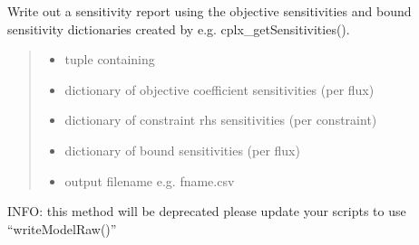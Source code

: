 \documentclass[letterpaper,12pt,english]{sphinxmanual}
\begin{document}
\begin{fulllineitems}

\pysigstartsignatures
\pysiglinewithargsret
{}
{\sphinxparamcomma {}}
{}
\pysigstopsignatures
\sphinxAtStartPar
Write out a sensitivity report using the objective sensitivities and bound sensitivity dictionaries created by e.g. cplx\_getSensitivities().
\begin{quote}\begin{description}
\begin{itemize}
\item {} 
\sphinxAtStartPar
{} \textendash{} tuple containing

\item {} 
\sphinxAtStartPar
{} \textendash{} dictionary of objective coefficient sensitivities (per flux)

\item {} 
\sphinxAtStartPar
{} \textendash{} dictionary of constraint rhs sensitivities (per constraint)

\item {} 
\sphinxAtStartPar
{} \textendash{} dictionary of bound sensitivities (per flux)

\item {} 
\sphinxAtStartPar
{} \textendash{} output filename e.g. fname.csv

\end{itemize}

\end{description}\end{quote}

\end{fulllineitems}



\begin{fulllineitems}

\pysigstartsignatures
\pysiglinewithargsret
{}
{\sphinxparamcomma {}}
{}
\pysigstopsignatures
\sphinxAtStartPar
INFO: this method will be deprecated please update your scripts to use “writeModelRaw()”

\end{fulllineitems}
\end{document}
